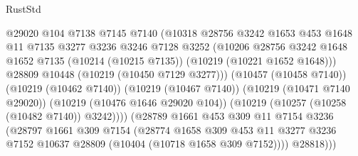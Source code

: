 \begin{lexlean}{RustStd}
\begin{coremodule}
                                  @29020
                                  @104
                                  @7138
                                  @7145
                                  @7140
                                  (@10318
                                    @28756
                                    @3242
                                    @1653
                                    @453
                                    @1648
                                    @11
                                    @7135
                                    @3277
                                    @3236
                                    @3246
                                    @7128
                                    @3252
                                    (@10206
                                      @28756
                                      @3242
                                      @1648
                                      @1652
                                      @7135
                                      (@10214 (@10215 @7135))
                                      (@10219 (@10221 @1652 @1648)))
                                    @28809
                                    @10448
                                    (@10219 (@10450 @7129 @3277)))
                                  (@10457 (@10458 @7140))
                                  (@10219 (@10462 @7140))
                                  (@10219 (@10467 @7140))
                                  (@10219 (@10471 @7140 @29020))
                                  (@10219 (@10476 @1646 @29020 @104))
                                  (@10219 (@10257 (@10258 (@10482 @7140)) @3242))))
                              (@28789
                                @1661
                                @453
                                @309
                                @11
                                @7154
                                @3236
                                (@28797
                                  @1661
                                  @309
                                  @7154
                                  (@28774
                                    @1658
                                    @309
                                    @453
                                    @11
                                    @3277
                                    @3236
                                    @7152
                                    @10637
                                    @28809
                                    (@10404 (@10718 @1658 @309 @7152))))
                                @28818)))

\end{coremodule}
\end{lexlean}
